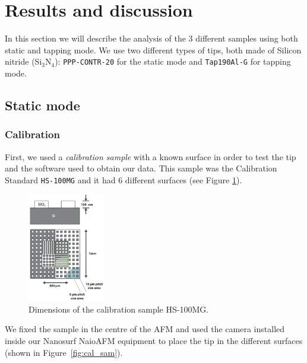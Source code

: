 \documentclass[11pt,a4paper]{article}
\begin{document}
\newpage
\section{Results and discussion}
In this section we will describe the analysis of the 3 different samples using both static and tapping mode. We use two different types of tips, both made of Silicon nitride (Si$_3$N$_4$): \texttt{PPP-CONTR-20} for the static mode and \texttt{Tap190Al-G} for tapping mode.

\subsection{Static mode}
\subsubsection{Calibration}
First, we used a \emph{calibration sample} with a known surface in order to test the tip and the software used to obtain our data. This sample was the Calibration Standard \texttt{HS-100MG} and it had 6 different surfaces (see Figure \ref{fig:HS-100MG}).

\begin{figure}[H]
\centering
\includegraphics[width=0.3\textwidth]{HS-100MG}
\caption{Dimensions of the calibration sample HS-100MG.}
\label{fig:HS-100MG}
\end{figure}

We fixed the sample in the centre of the AFM and used the camera installed inside our Nanosurf NaioAFM equipment to place the tip in the different surfaces (shown in Figure~\ref{fig:cal_sam}).
\end{document}
